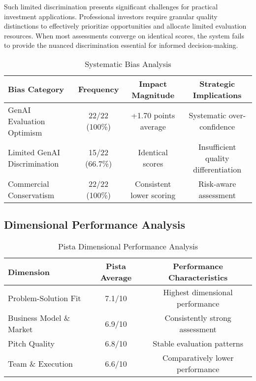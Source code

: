 Such limited discrimination presents significant challenges for practical investment applications. Professional investors require granular quality distinctions to effectively prioritize opportunities and allocate limited evaluation resources. When most assessments converge on identical scores, the system fails to provide the nuanced discrimination essential for informed decision-making.

\begin{table}[ht]
    \centering
    \caption{Systematic Bias Analysis}
    \label{tab:bias-analysis}
    \begin{tabular}{lccc}
        \toprule
        \textbf{Bias Category} & \textbf{Frequency} & \textbf{Impact Magnitude} & \textbf{Strategic Implications} \\
        \midrule
        GenAI Evaluation Optimism & 22/22 (100\%) & +1.70 points average & Systematic over-confidence \\
        Limited GenAI Discrimination & 15/22 (66.7\%) & Identical scores & Insufficient quality differentiation \\
        Commercial Conservatism & 22/22 (100\%) & Consistent lower scoring & Risk-aware assessment \\
        \bottomrule
    \end{tabular}
\end{table}

\subsection{Dimensional Performance Analysis}
\label{subsec:dimensional}

\begin{table}[ht]
    \centering
    \caption{Pista Dimensional Performance Analysis}
    \label{tab:dimensional-analysis}
    \begin{tabular}{lcc}
        \toprule
        \textbf{Dimension} & \textbf{Pista Average} & \textbf{Performance Characteristics} \\
        \midrule
        Problem-Solution Fit & 7.1/10 & Highest dimensional performance \\
        Business Model \& Market & 6.9/10 & Consistently strong assessment \\
        Pitch Quality & 6.8/10 & Stable evaluation patterns \\
        Team \& Execution & 6.6/10 & Comparatively lower performance \\
        \bottomrule
    \end{tabular}
\end{table}


